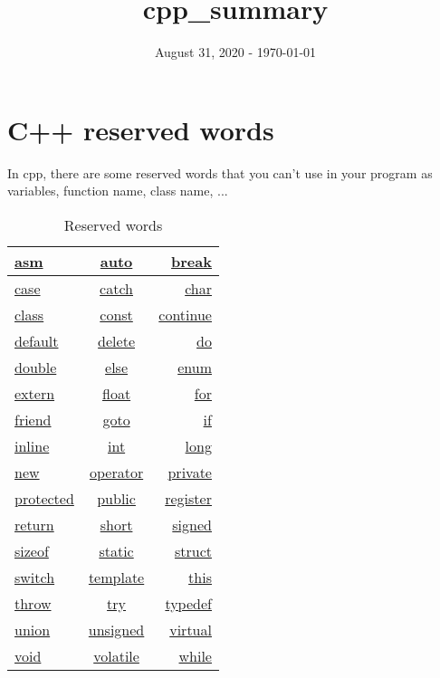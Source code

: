 \documentclass[a4paper, 12pt, titlepage]{scrartcl} %
\title{cpp\_summary}
\author{}
\date{August 31, 2020 - \today}
\begin{document}
\maketitle

\newpage
\section{C++ reserved words}
In cpp, there are some reserved words that you can't use in your program as variables, function name, class name, ...

\vspace{20mm}

\begin{table}[h]
\begin{center}
{\renewcommand{\arraystretch}{1.75} %
{\setlength{\tabcolsep}{1.5cm} %
\begin{tabular}{|l|c|r|}
  \hline
  \hyperref[]{asm} & \hyperref[]{auto} & \hyperref[]{break} \\
  \hline
  \hyperref[]{case} & \hyperref[]{catch} & \hyperref[]{char} \\
  \hline
  \hyperref[]{class} & \hyperref[]{const} & \hyperref[]{continue} \\
  \hline
  \hyperref[]{default} & \hyperref[]{delete} & \hyperref[]{do} \\
  \hline
  \hyperref[]{double} & \hyperref[]{else} & \hyperref[]{enum} \\
  \hline
  \hyperref[]{extern} & \hyperref[]{float} & \hyperref[]{for} \\
  \hline
  \hyperref[]{friend} & \hyperref[]{goto} & \hyperref[]{if} \\
  \hline
  \hyperref[]{inline} & \hyperref[]{int} & \hyperref[]{long} \\
  \hline 
  \hyperref[]{new} & \hyperref[]{operator} & \hyperref[]{private} \\
  \hline 
  \hyperref[]{protected} & \hyperref[]{public} & \hyperref[]{register} \\
  \hline
  \hyperref[]{return} & \hyperref[]{short} & \hyperref[]{signed} \\
  \hline
  \hyperref[]{sizeof} & \hyperref[]{static} & \hyperref[]{struct} \\
  \hline
  \hyperref[]{switch} & \hyperref[]{template} & \hyperref[]{this} \\
  \hline
  \hyperref[]{throw} & \hyperref[]{try} & \hyperref[]{typedef} \\
  \hline
  \hyperref[]{union} & \hyperref[]{unsigned} & \hyperref[]{virtual} \\
  \hline
  \hyperref[]{void} & \hyperref[]{volatile} & \hyperref[]{while} \\
  \hline
\end{tabular}}}
\end{center}
\caption{Reserved words}
\end{table} \vspace{5mm}
\end{document}
